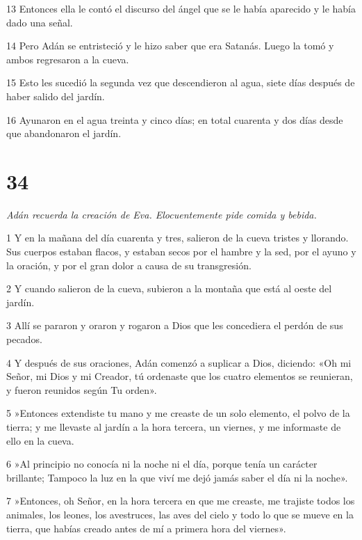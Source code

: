 \par 13 Entonces ella le contó el discurso del ángel que se le había aparecido y le había dado una señal.

\par 14 Pero Adán se entristeció y le hizo saber que era Satanás. Luego la tomó y ambos regresaron a la cueva.

\par 15 Esto les sucedió la segunda vez que descendieron al agua, siete días después de haber salido del jardín.

\par 16 Ayunaron en el agua treinta y cinco días; en total cuarenta y dos días desde que abandonaron el jardín.

\chapter{34}

\par \textit{Adán recuerda la creación de Eva. Elocuentemente pide comida y bebida.}

\par 1 Y en la mañana del día cuarenta y tres, salieron de la cueva tristes y llorando. Sus cuerpos estaban flacos, y estaban secos por el hambre y la sed, por el ayuno y la oración, y por el gran dolor a causa de su transgresión.

\par 2 Y cuando salieron de la cueva, subieron a la montaña que está al oeste del jardín.

\par 3 Allí se pararon y oraron y rogaron a Dios que les concediera el perdón de sus pecados.

\par 4 Y después de sus oraciones, Adán comenzó a suplicar a Dios, diciendo: «Oh mi Señor, mi Dios y mi Creador, tú ordenaste que los cuatro elementos se reunieran, y fueron reunidos según Tu orden».

\par 5 »Entonces extendiste tu mano y me creaste de un solo elemento, el polvo de la tierra; y me llevaste al jardín a la hora tercera, un viernes, y me informaste de ello en la cueva.

\par 6 »Al principio no conocía ni la noche ni el día, porque tenía un carácter brillante; Tampoco la luz en la que viví me dejó jamás saber el día ni la noche».

\par 7 »Entonces, oh Señor, en la hora tercera en que me creaste, me trajiste todos los animales, los leones, los avestruces, las aves del cielo y todo lo que se mueve en la tierra, que habías creado antes de mí a primera hora del viernes».

